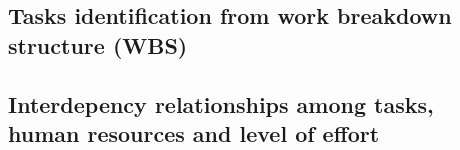 \subsection{Tasks identification from work breakdown structure (WBS)}


\pagebreak

\subsection{Interdepency relationships among tasks, human resources and level of effort}
\begin{longtable}{ | p{1.3cm} | p{5cm} | p{3cm} | p{3.5cm} |}
\hline


\end{longtable}
